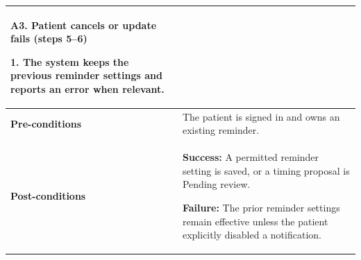 \begin{longtable}{|p{}|p{}|}
\par\smallskip
\textbf{A3. Patient cancels or update fails (steps 5--6)}\par
1. The system keeps the previous reminder settings and reports an error when relevant.
\\ \hline
\textbf{Pre-conditions} & The patient is signed in and owns an existing reminder. \\ \hline
\textbf{Post-conditions} & \textbf{Success:} A permitted reminder setting is saved, or a timing proposal is Pending review.\par
\textbf{Failure:} The prior reminder settings remain effective unless the patient explicitly disabled a notification. \\ \hline
\end{longtable}

